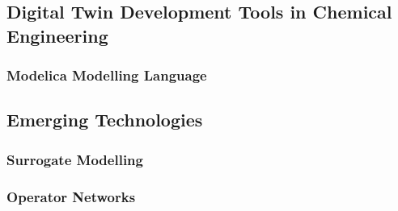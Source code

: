 \subsection{Digital Twin Development Tools in Chemical Engineering}

\subsubsection{Modelica Modelling Language}




\subsection{Emerging Technologies }





\subsubsection{Surrogate Modelling}

\subsubsection{Operator Networks}



